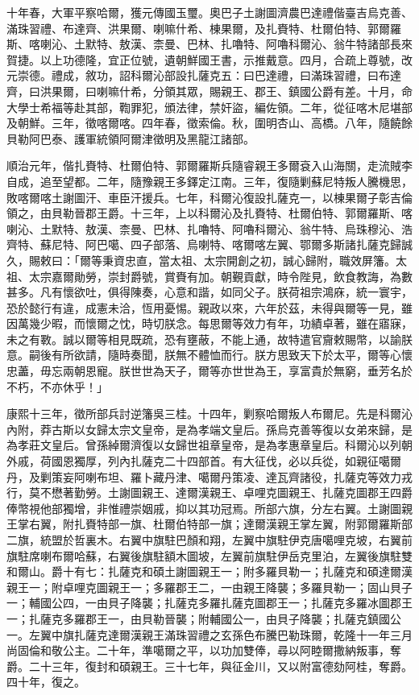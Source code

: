 \begin{pinyinscope}
十年春，大軍平察哈爾，獲元傳國玉璽。奧巴子土謝圖濟農巴達禮偕臺吉烏克善、滿珠習禮、布達齊、洪果爾、喇嘛什希、棟果爾，及扎賚特、杜爾伯特、郭爾羅斯、喀喇沁、土默特、敖漢、柰曼、巴林、扎嚕特、阿嚕科爾沁、翁牛特諸部長來賀捷。以上功德隆，宜正位號，遺朝鮮國王書，示推戴意。四月，合疏上尊號，改元崇德。禮成，敘功，詔科爾沁部設扎薩克五：曰巴達禮，曰滿珠習禮，曰布達齊，曰洪果爾，曰喇嘛什希，分領其眾，賜親王、郡王、鎮國公爵有差。十月，命大學士希福等赴其部，鞫罪犯，頒法律，禁奸盜，編佐領。二年，從征喀木尼堪部及朝鮮。三年，徵喀爾喀。四年春，徵索倫。秋，圍明杏山、高橋。八年，隨饒餘貝勒阿巴泰、護軍統領阿爾津徵明及黑龍江諸部。

順治元年，偕扎賚特、杜爾伯特、郭爾羅斯兵隨睿親王多爾袞入山海關，走流賊李自成，追至望都。二年，隨豫親王多鐸定江南。三年，復隨剿蘇尼特叛人騰機思，敗喀爾喀土謝圖汗、車臣汗援兵。七年，科爾沁復設扎薩克一，以棟果爾子彰吉倫領之，由貝勒晉郡王爵。十三年，上以科爾沁及扎賚特、杜爾伯特、郭爾羅斯、喀喇沁、土默特、敖漢、柰曼、巴林、扎嚕特、阿嚕科爾沁、翁牛特、烏珠穆沁、浩齊特、蘇尼特、阿巴噶、四子部落、烏喇特、喀爾喀左翼、鄂爾多斯諸扎薩克歸誠久，賜敕曰：「爾等秉資忠直，當太祖、太宗開創之初，誠心歸附，職效屏籓。太祖、太宗嘉爾勛勞，崇封爵號，賞賚有加。朝覲貢獻，時令陛見，飲食教誨，為數甚多。凡有懷欲吐，俱得陳奏，心意和諧，如同父子。朕荷祖宗鴻庥，統一寰宇，恐於懿行有違，成憲未洽，恆用憂惕。親政以來，六年於茲，未得與爾等一見，雖因萬幾少暇，而懷爾之忱，時切朕念。每思爾等效力有年，功績卓著，雖在寤寐，未之有斁。誠以爾等相見既疏，恐有壅蔽，不能上通，故特遣官齎敕賜幣，以諭朕意。嗣後有所欲請，隨時奏聞，朕無不體恤而行。朕方思致天下於太平，爾等心懷忠藎，毋忘兩朝恩寵。朕世世為天子，爾等亦世世為王，享富貴於無窮，垂芳名於不朽，不亦休乎！」

康熙十三年，徵所部兵討逆籓吳三桂。十四年，剿察哈爾叛人布爾尼。先是科爾沁內附，莽古斯以女歸太宗文皇帝，是為孝端文皇后。孫烏克善等復以女弟來歸，是為孝莊文皇后。曾孫綽爾濟復以女歸世祖章皇帝，是為孝惠章皇后。科爾沁以列朝外戚，荷國恩獨厚，列內扎薩克二十四部首。有大征伐，必以兵從，如親征噶爾丹，及剿策妄阿喇布坦、羅卜藏丹津、噶爾丹策凌、達瓦齊諸役，扎薩克等效力戎行，莫不懋著勤勞。土謝圖親王、達爾漢親王、卓哩克圖親王、扎薩克圖郡王四爵俸幣視他部獨增，非惟禮崇姻戚，抑以其功冠焉。所部六旗，分左右翼。土謝圖親王掌右翼，附扎賚特部一旗、杜爾伯特部一旗；達爾漢親王掌左翼，附郭爾羅斯部二旗，統盟於哲裏木。右翼中旗駐巴顏和翔，左翼中旗駐伊克唐噶哩克坡，右翼前旗駐席喇布爾哈蘇，右翼後旗駐額木圖坡，左翼前旗駐伊岳克里泊，左翼後旗駐雙和爾山。爵十有七：扎薩克和碩土謝圖親王一；附多羅貝勒一；扎薩克和碩達爾漢親王一；附卓哩克圖親王一；多羅郡王二，一由親王降襲；多羅貝勒一；固山貝子一；輔國公四，一由貝子降襲；扎薩克多羅扎薩克圖郡王一；扎薩克多羅冰圖郡王一；扎薩克多羅郡王一，由貝勒晉襲；附輔國公一，由貝子降襲；扎薩克鎮國公一。左翼中旗扎薩克達爾漢親王滿珠習禮之玄孫色布騰巴勒珠爾，乾隆十一年三月尚固倫和敬公主。二十年，準噶爾之平，以功加雙俸，尋以阿睦爾撒納叛事，奪爵。二十三年，復封和碩親王。三十七年，與征金川，又以附富德劾阿桂，奪爵。四十年，復之。


\end{pinyinscope}
